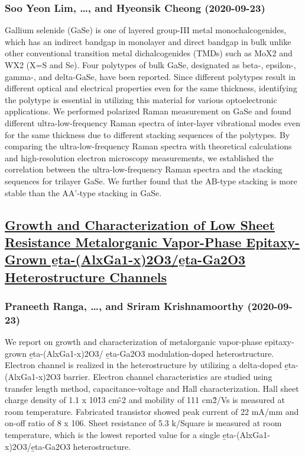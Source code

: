 {\subsubsection*{Soo Yeon Lim, \dots, and Hyeonsik Cheong (2020-09-23)}
Gallium selenide (GaSe) is one of layered group-III metal monochalcogenides,
which has an indirect bandgap in monolayer and direct bandgap in bulk unlike
other conventional transition metal dichalcogenides (TMDs) such as MoX2 and WX2
(X=S and Se). Four polytypes of bulk GaSe, designated as beta-, epsilon-,
gamma-, and delta-GaSe, have been reported. Since different polytypes result in
different optical and electrical properties even for the same thickness,
identifying the polytype is essential in utilizing this material for various
optoelectronic applications. We performed polarized Raman measurement on GaSe
and found different ultra-low-frequency Raman spectra of inter-layer
vibrational modes even for the same thickness due to different stacking
sequences of the polytypes. By comparing the ultra-low-frequency Raman spectra
with theoretical calculations and high-resolution electron microscopy
measurements, we established the correlation between the ultra-low-frequency
Raman spectra and the stacking sequences for trilayer GaSe. We further found
that the AB-type stacking is more stable than the AA'-type stacking in GaSe.

\subsection*{\href{http://arxiv.org/abs/2009.10952v1}{Growth and Characterization of Low Sheet Resistance Metalorganic  Vapor-Phase Epitaxy-Grown \b{eta}-(AlxGa1-x)2O3/\b{eta}-Ga2O3 Heterostructure  Channels}}
\subsubsection*{Praneeth Ranga, \dots, and Sriram Krishnamoorthy (2020-09-23)}
We report on growth and characterization of metalorganic vapor-phase
epitaxy-grown \b{eta}-(AlxGa1-x)2O3/ \b{eta}-Ga2O3 modulation-doped
heterostructure. Electron channel is realized in the heterostructure by
utilizing a delta-doped \b{eta}-(AlxGa1-x)2O3 barrier. Electron channel
characteristics are studied using transfer length method, capacitance-voltage
and Hall characterization. Hall sheet charge density of 1.1 x 10\^13 cm\^-2 and
mobility of 111 cm\^2/Vs is measured at room temperature. Fabricated transistor
showed peak current of 22 mA/mm and on-off ratio of 8 x 106. Sheet resistance
of 5.3 k{\Omega}/Square is measured at room temperature, which is the lowest
reported value for a single \b{eta}-(AlxGa1-x)2O3/\b{eta}-Ga2O3
heterostructure.

}
